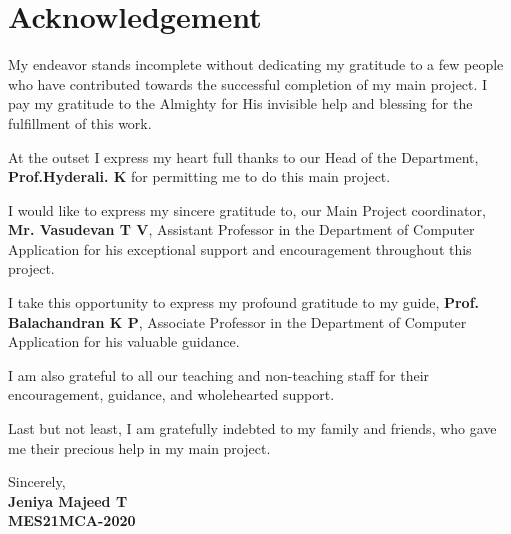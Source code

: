\documentclass[12pt]{report}
\begin{document}
\chapter*{Acknowledgement}
\thispagestyle{empty}

My endeavor stands incomplete without dedicating my gratitude to a few people who have contributed towards the successful completion of my main project.\newline \newline
I pay my gratitude to the Almighty for His invisible help and blessing for the fulfillment of this work.\newline

At the outset I express my heart full thanks to our Head of the Department, \textbf{Prof.Hyderali. K} for permitting me to do this main project.\newline

I would like to express my sincere gratitude to, our Main Project coordinator,\textbf{ Mr. Vasudevan T V}, Assistant Professor in the Department of Computer Application for his exceptional support and encouragement throughout this project.\newline

I take this opportunity to express my profound gratitude to my guide, \textbf{Prof. Balachandran K P}, Associate Professor in the Department of Computer Application for his valuable guidance. \newline

I am also grateful to all our teaching and non-teaching staff for their encouragement, guidance, and wholehearted support.\newline

Last but not least, I am gratefully indebted to my family and friends, who gave me their precious help in my main project.

\vspace{0.5cm}

\begin{flushright}
Sincerely, \\
\textbf{Jeniya Majeed T \\
MES21MCA-2020}\\
\end{flushright}

\end{document}
